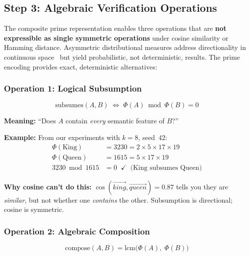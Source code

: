 \documentclass[10pt]{article}
\begin{document}
\subsection{Step 3: Algebraic Verification Operations}

The composite prime representation enables three operations that are \textbf{not expressible as single symmetric operations} under cosine similarity or Hamming distance. Asymmetric distributional measures address directionality in continuous space~\cite{weeds2003general,kotlerman2010directional,tversky1977features} but yield probabilistic, not deterministic, results. The prime encoding provides exact, deterministic alternatives:

\subsubsection{Operation 1: Logical Subsumption}

\begin{equation}
\boxed{\;\text{subsumes}(A, B) \;\iff\; \Phi(A) \bmod \Phi(B) = 0\;}
\label{eq:subsumption}
\end{equation}

\noindent\textbf{Meaning:} ``Does $A$ contain \emph{every} semantic feature of $B$?''

\smallskip\noindent\textbf{Example:} From our experiments with $k\!=\!8$, seed~$42$:
\begin{align*}
\Phi(\text{King}) &= 3230 = 2 \times 5 \times 17 \times 19 \\
\Phi(\text{Queen}) &= 1615 = 5 \times 17 \times 19 \\
3230 \bmod 1615 &= 0 \;\;\checkmark \;\;\text{(King subsumes Queen)}
\end{align*}

\noindent\textbf{Why cosine can't do this:} $\cos(\vec{king}, \vec{queen}) = 0.87$ tells you they are \emph{similar}, but not whether one \emph{contains} the other. Subsumption is directional; cosine is symmetric.

\subsubsection{Operation 2: Algebraic Composition}

\begin{equation}
\boxed{\;\text{compose}(A, B) = \text{lcm}\big(\Phi(A),\; \Phi(B)\big)\;}
\label{eq:composition}
\end{equation}
\end{document}
